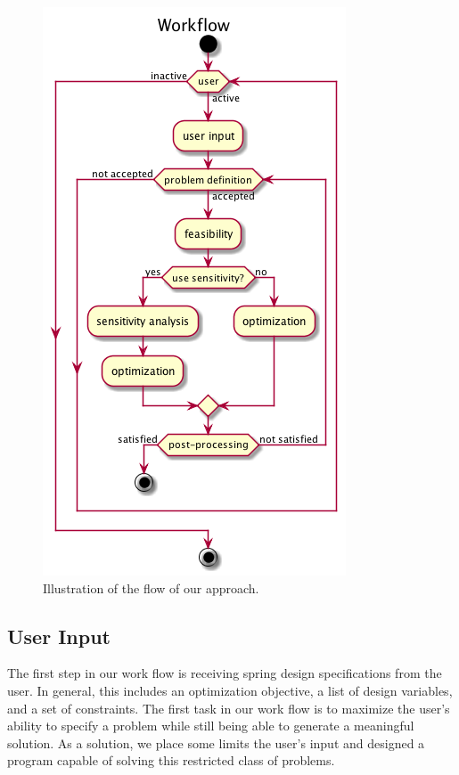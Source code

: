 \documentclass[10pt]{article}
\begin{document}
		\begin{figure}[h!]
		 \begin{center}\includegraphics[scale=.4]{IMSM_Workflow.png}\end{center}
		 \caption{Illustration of the flow of our approach.}
		 \label{Workflow}
		 
		 \end{figure}

\subsection{User Input}
\label{sec:User Input}

The first step in our work flow is receiving spring design specifications from the user. In general, this includes an optimization objective, a list of design variables, and a set of constraints. The first task in our work flow is to maximize the user's ability to specify a problem while still being able to generate a meaningful solution. As a solution, we place some limits the user's input and designed a program capable of solving this restricted class of problems.
\end{document}
